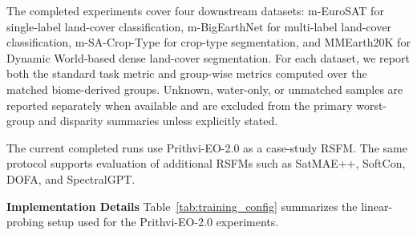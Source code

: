 \documentclass[10pt,twocolumn,letterpaper]{article}
\begin{document}
The completed experiments cover four downstream datasets: m-EuroSAT for single-label land-cover classification, m-BigEarthNet for multi-label land-cover classification, m-SA-Crop-Type for crop-type segmentation, and MMEarth20K for Dynamic World-based dense land-cover segmentation. For each dataset, we report both the standard task metric and group-wise metrics computed over the matched biome-derived groups. Unknown, water-only, or unmatched samples are reported separately when available and are excluded from the primary worst-group and disparity summaries unless explicitly stated.

The current completed runs use Prithvi-EO-2.0 as a case-study RSFM. The same protocol supports evaluation of additional RSFMs such as SatMAE++, SoftCon, DOFA, and SpectralGPT.

\noindent \textbf{Implementation Details} Table~\ref{tab:training_config} summarizes the linear-probing setup used for the Prithvi-EO-2.0 experiments.

\begin{table}[t]
\centering \small
\caption{Prithvi-EO-2.0 linear-probing setup used in the current experiments.}
\label{tab:training_config}
\end{table}

\end{document}
